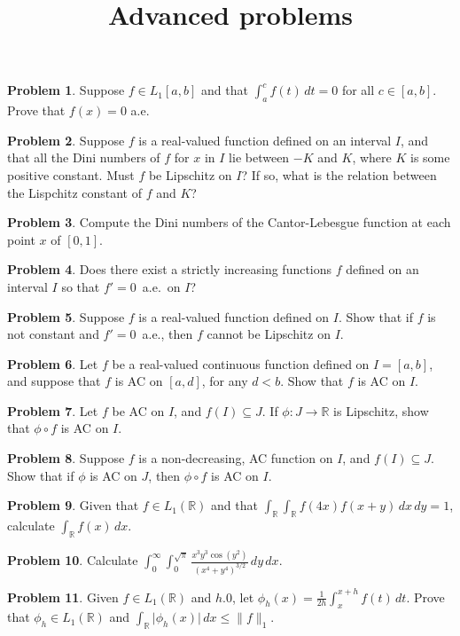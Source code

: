 \documentclass[12pt,reqno]{amsart}
\def\field#1{\mathbb{#1}}
\def\abs#1{\lvert {#1} \rvert}
\def\Lpnorm#1#2{\lVert {#1} \rVert_{#2}}
\theoremstyle{definition}
\newtheorem{problem}{Problem}
\theoremstyle{remark}
\begin{document}
\title{Advanced problems}
\maketitle

\begin{problem}
  Suppose $f \in L_1[a,b]$ and that $\int_a^c f(t)\, dt = 0$ for all
  $c \in [a,b]$. Prove that $f(x) = 0$ a.e.
\end{problem}
\begin{problem}
  Suppose $f$ is a real-valued function defined on an interval $I$,
  and that all the Dini numbers of $f$ for $x$ in $I$ lie between $-K$
  and $K$, where $K$ is some positive constant.  Must $f$ be Lipschitz
  on $I$?  If so, what is the relation between the Lispchitz constant
  of $f$ and $K$?
\end{problem}
\begin{problem}
  Compute the Dini numbers of the Cantor-Lebesgue function at each
  point $x$ of $[0,1]$.
\end{problem}
\begin{problem}
  Does there exist a strictly increasing functions $f$ defined on an
  interval $I$ so that $f' = 0$~a.e.~on $I$?
\end{problem}
\begin{problem}
  Suppose $f$ is a real-valued function defined on $I$.  Show that if
  $f$ is not constant and $f'=0$~a.e., then $f$ cannot be Lipschitz on
  $I$.
\end{problem}
\begin{problem}
  Let $f$ be a real-valued continuous function defined on $I=[a,b]$,
  and suppose that $f$ is AC on $[a,d]$, for any $d<b$.  Show that $f$
  is AC on $I$.
\end{problem}
\begin{problem}
  Let $f$ be AC on $I$, and $f(I) \subseteq J$.  If $\phi\colon J \to
  \field{R}$ is Lipschitz, show that $\phi \circ f$ is AC on $I$.
\end{problem}
\begin{problem}
  Suppose $f$ is a non-decreasing, AC function on $I$, and $f(I)
  \subseteq J$.  Show that if $\phi$ is AC on $J$, then $\phi \circ
  f$ is AC on $I$.
\end{problem}

\begin{problem}
  Given that $f \in L_1(\field{R})$ and that $\int_{\field{R}}
  \int_{\field{R}} f(4x) f(x+y)\, dx\, dy = 1$, calculate
  $\int_{\field{R}} f(x)\, dx$.
\end{problem}
\begin{problem}
  Calculate $\displaystyle{ \int_0^\infty \int_0^{\sqrt{\pi}}
    \frac{x^3 y^3 \cos(y^2)}{(x^4 + y^4)^{3/2}}\, dy\, dx }$.
\end{problem}
\begin{problem}
  Given $f \in L_1(\field{R})$ and $h.0$, let $\phi_h(x) =
  \frac{1}{2h} \int_x^{x+h} f(t)\, dt$.  Prove that $\phi_h \in
  L_1(\field{R})$ and $\int_{\field{R}} \abs{\phi_h(x)}\, dx \leq
  \Lpnorm{f}{1}$.
\end{problem}
\end{document}
